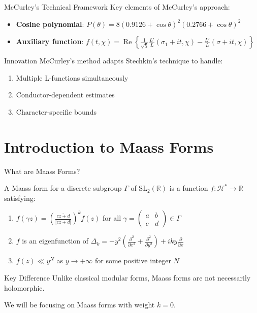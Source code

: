\documentclass{beamer}
\def\Re{\operatorname{Re}}
\begin{document}
\begin{frame}{McCurley's Technical Framework}
Key elements of McCurley's approach:

\begin{itemize}
\item \textbf{Cosine polynomial}: $P(\theta) = 8(0.9126 + \cos \theta)^2(0.2766 + \cos \theta)^2$
\item \textbf{Auxiliary function}: $f(t,\chi) = \Re\left\{\frac{1}{\sqrt{5}}\frac{L'}{L}(\sigma_1 + it, \chi) - \frac{L'}{L}(\sigma + it, \chi)\right\}$
\end{itemize}

\vspace{0.3cm}

\begin{block}{Innovation}
McCurley's method adapts Stechkin's technique to handle:
\begin{enumerate}
\item Multiple L-functions simultaneously
\item Conductor-dependent estimates
\item Character-specific bounds
\end{enumerate}
\end{block}
\end{frame}

\section{Introduction to Maass Forms}

\begin{frame}{What are Maass Forms?}
\begin{definition}
A Maass form for a discrete subgroup $\Gamma$ of $\text{SL}_2(\mathbb{R})$ is a function $f: \mathcal{H}^* \to \mathbb{R}$ satisfying:
\begin{enumerate}
\item $f(\gamma z) = \left(\frac{\overline{cz+d}}{|cz+d|}\right)^k f(z)$ for all $\gamma = \begin{pmatrix} a & b \\ c & d \end{pmatrix} \in \Gamma$
\item $f$ is an eigenfunction of $\Delta_k = -y^2\left(\frac{\partial^2}{\partial x^2} + \frac{\partial^2}{\partial y^2}\right) + iky\frac{\partial}{\partial x}$
\item $f(z) \ll y^N$ as $y \to +\infty$ for some positive integer $N$
\end{enumerate}
\end{definition}

\vspace{0.3cm}

\begin{block}{Key Difference}
Unlike classical modular forms, Maass forms are not necessarily holomorphic.
\end{block}
We will be focusing on Maass forms with weight $k=0$.
\end{frame}
\end{document}
